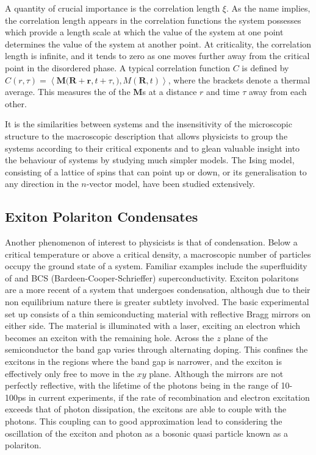 \documentclass[letterpaper, 10 pt, conference]{IEEEtran}  %
\newcommand{\mean}[1]{\left < #1 \right >}
\newcommand{\myvec}[1]{\boldsymbol{#1}}
\begin{document}
A quantity of crucial importance is the correlation length $\xi$. As the name implies, the correlation length appears in the correlation functions the system possesses which provide a length scale at which the value of the system at one point determines the value of the system at another point. 
At criticality, the correlation length is infinite, and it tends to zero as one moves further away from the critical point in the disordered phase.  
A typical correlation function $C$ is defined by $C(r,\tau) = \mean{\myvec{M}(\myvec{R} + \myvec{r}, t+\tau,\myvec),{M}(\myvec{R}, t)}$, where the brackets denote a thermal average. 
This measures the of the $\myvec{M}$s at a distance $r$ and time $\tau$ away from each other. 

It is the similarities between systems and the insensitivity of the microscopic structure to the  macroscopic description that allows physicists to group the systems according to their critical exponents and to glean valuable insight into the behaviour of systems by studying much simpler models.
The Ising model, consisting of a lattice of spins that can point up or down, or its generalisation to any direction in the $n$-vector model, have been studied extensively.  
 
\subsection{Exiton Polariton Condensates}

Another phenomenon of interest to physicists is that of condensation. 
Below a critical temperature or above a critical density, a macroscopic number of particles occupy the ground state of a system. 
Familiar examples include the superfluidity of  and BCS (Bardeen-Cooper-Schrieffer) superconductivity.
Exciton polaritons are a more recent of a system that undergoes condensation, although due to their non equilibrium nature there is greater subtlety involved.  
The basic experimental set up consists of a thin semiconducting material with reflective Bragg mirrors on either side. 
The material is illuminated with a laser, exciting an electron which becomes an exciton with the remaining hole. 
Across the $z$ plane of the semiconductor the band gap varies through alternating doping. 
This confines the excitons in the regions where the band gap is narrower, and the exciton is effectively only free to move in the $xy$ plane.
Although the mirrors are not perfectly reflective, with the lifetime of the photons being in the range of 10-100ps in current experiments, if the rate of recombination and electron excitation exceeds that of photon dissipation, the excitons are able to couple with the photons. 
This coupling can to good approximation lead to considering the oscillation of the exciton and photon as a bosonic quasi particle known as a polariton.    
 
\end{document}
